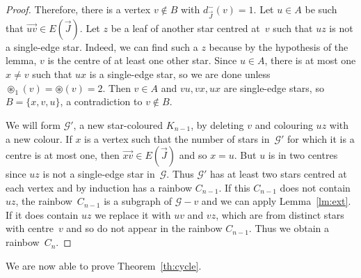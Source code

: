 \documentclass[a4paper, 12pt]{article}
\numberwithin{equation}{section}
\def\cen{\circledast}
\newcommand{\ova}[1]{\overrightarrow{#1}}
\newcommand{\ms}[1]{\mathscr{#1}}
\begin{document}
\begin{proof}
        
    Therefore, there is a vertex $v \notin B$ with $d^-_{\ova{J}}(v)=1$.
    Let $u \in A$ be such that $\ova{uv} \in E(\ova{J})$.
    Let $z$ be a leaf of another star centred at~$v$ such that $uz$ is not a single-edge star.
    Indeed, we can find such a $z$ because by the hypothesis of the lemma, $v$ is the centre of at least one other star.
    Since $u \in A$, there is at most one $x \neq v$ such that $ux$ is a single-edge star, so we are done unless $\cen_1(v) = \cen(v) = 2$.
     Then $v \in A$ and $vu,vx,ux$ are single-edge stars, so $B = \{x,v,u\}$, a contradiction to $v \notin B$.

    We will form $\ms{G}'$, a new star-coloured $K_{n-1}$, by deleting $v$ and colouring $uz$ with a new colour. 
    If $x$ is a vertex such that the number of stars in~$\ms{G}'$ for which it is a centre is at most one, then $\ova{xv} \in E(\ova{J})$ and so $x=u$.
    But $u$ is in two centres since $uz$ is not a single-edge star in~$\ms{G}$.
    Thus $\ms{G}'$ has at least two stars centred at each vertex and by induction has a rainbow $C_{n-1}$.
    If this $C_{n-1}$ does not contain~$uz$, the rainbow~$C_{n-1}$ is a subgraph of $\ms{G}-v$ and we can apply Lemma~\ref{lm:ext}.
    If it does contain $uz$ we replace it with $uv$ and $vz$, which are from distinct stars with centre~$v$ and so do not appear in the rainbow $C_{n-1}$. 
    Thus we obtain a rainbow~$C_n$.
\end{proof}





We are now able to prove Theorem~\ref{th:cycle}. 
\end{document}
